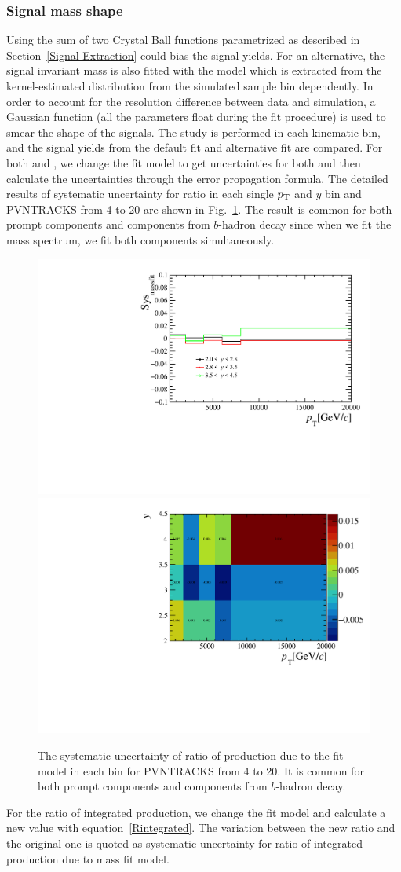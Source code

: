 \subsubsection{Signal mass shape}
\label{sec:masssyst}
Using the sum of two Crystal Ball functions parametrized as described in Section~\ref{Signal Extraction} could bias the signal yields.
For an alternative, the signal invariant mass is also fitted with the model which is extracted from the kernel-estimated distribution from the simulated sample bin dependently. 
In order to account for the resolution difference between data and simulation, a Gaussian function (all the parameters float during the fit procedure) is used to smear the shape of the signals.
The study is performed in each kinematic bin, and the signal yields from the default fit and alternative fit are compared.
For both \jpsi and \psitwos, we change the fit model to get uncertainties for both and then calculate the uncertainties through the error propagation formula.
The detailed results of systematic uncertainty for ratio in each single $p_{\mathrm{T}}$ and $y$ bin and PVNTRACKS from 4 to 20 are shown in Fig.~\ref{sys_mass}.
The result is common for both prompt components and components from $b$-hadron decay since when we fit the mass spectrum, we fit both components simultaneously. 
\begin{figure}[!tbp]
    \begin{center}
      \includegraphics[width=0.49\linewidth]{pdf/SysMPlot/n1Err_point.pdf}
      \includegraphics[width=0.49\linewidth]{pdf/SysMPlot/n1Err.pdf}
    \end{center}
    \caption{The systematic uncertainty of ratio of production due to the fit model in each bin for PVNTRACKS from 4 to 20. It is common for both prompt components and components from $b$-hadron decay.
      }
    \label{sys_mass}
\end{figure}
For the ratio of integrated production, we change the fit model and calculate a new value with equation~\ref{Rintegrated}. The variation 
between the new ratio and the original one is quoted as systematic uncertainty for ratio of integrated production due to mass fit model. 


